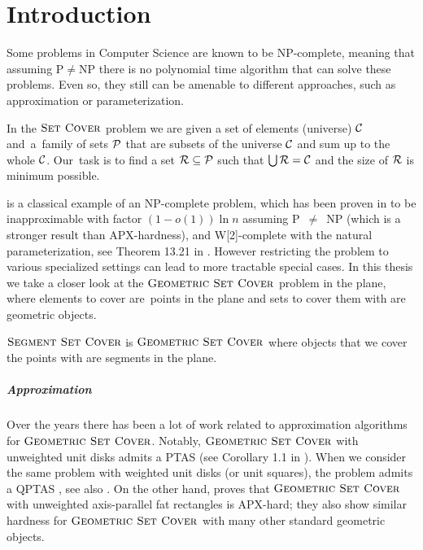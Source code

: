 \chapter{Introduction}

Some problems in Computer Science are known to be NP-complete,
meaning that assuming P$\neq$NP there is no polynomial time
algorithm that can solve these problems.
Even so, they still can be amenable to different approaches,
such as approximation or parameterization.

\begin{defi}
In the \textbf{$\textsc{Set Cover}$} problem we are given a set of elements (universe)
$\mathcal{C}$ and~a~family of sets $\mathcal{P}$ that are subsets of the universe $\mathcal{C}$
and sum up to the whole $\mathcal{C}$.
Our~task is to find a set $\mathcal{R} \subseteq \mathcal{P}$
such that $\bigcup \mathcal{R} = \mathcal{C}$ and the size of $\mathcal{R}$ is minimum possible.
\end{defi}

\SetCover is a classical example of an NP-complete problem,
which has been proven
in \cite{set_cover_inapproximation} to be
inapproximable with factor $(1-o(1))\ln n$ assuming P~$\neq$~NP
(which is a stronger result than APX-hardness),
and W[2]-complete with the natural parameterization,
see Theorem 13.21 in \cite{platypus_book}.
However restricting the problem to various specialized settings
can lead to more tractable special cases.
In this thesis we take a closer look at the $\textsc{Geometric Set Cover}$ problem
in the plane, where elements to cover are~points in the plane
and sets to cover them with are geometric objects.

\begin{defi}
\textbf{$\textsc{Segment Set Cover}$} is $\textsc{Geometric Set Cover}$ where
objects that we cover the points with are segments in the plane.
\end{defi}

\paragraph{Approximation}
Over the years there has been a lot of work related to approximation
algorithms for $\textsc{Geometric Set Cover}$. Notably,
$\textsc{Geometric Set Cover}$ with unweighted unit disks admits a PTAS (see
Corollary 1.1 in \cite{unit_disks}). When we consider the same problem
with weighted unit disks (or unit squares), the problem admits a QPTAS
\cite{settling_apx_hardness}, see also \cite{voronoi_true}.
On the other hand, \cite{rectangles_apx_hard} 
proves that $\textsc{Geometric Set Cover}$ with unweighted axis-parallel fat rectangles
is APX-hard; they also show similar hardness
for $\textsc{Geometric Set Cover}$ with many other standard geometric objects.

